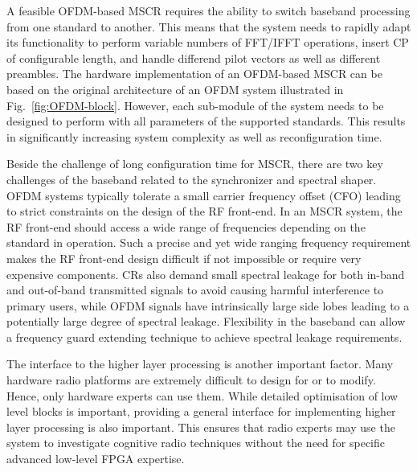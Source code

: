 A feasible OFDM-based MSCR requires the ability to switch baseband processing from one standard to another. This means that the system needs to rapidly adapt its functionality to perform variable numbers of FFT/IFFT operations, insert CP of configurable length, and handle differend pilot vectors as well as different preambles. The hardware implementation of an OFDM-based MSCR can be based on the original architecture of an OFDM system illustrated in Fig.~\ref{fig:OFDM-block}. However, each sub-module of the system needs to be designed to perform with all parameters of the supported standards. This results in significantly increasing system complexity as well as reconfiguration time.   


Beside the challenge of long configuration time for MSCR, there are two key challenges of the baseband related to the synchronizer and spectral shaper. OFDM systems typically tolerate a small carrier frequency offset (CFO) leading to strict constraints on the design of the RF front-end. In an MSCR system, the RF front-end should access a wide range of frequencies depending on the standard in operation. Such a precise and yet wide ranging frequency requirement makes the RF front-end design difficult if not impossible or require very expensive components.
CRs also demand small spectral leakage for both in-band and out-of-band transmitted signals to avoid causing harmful interference to primary users, while OFDM signals have intrinsically large side lobes leading to a potentially large degree of spectral leakage. 
Flexibility in the baseband can allow a frequency guard extending technique to achieve spectral leakage requirements.

The interface to the higher layer processing is another important factor. Many hardware radio platforms are extremely difficult to design for or to modify. Hence, only hardware experts can use them. While detailed optimisation of low level blocks is important, providing a general interface for implementing higher layer processing is also important. This ensures that radio experts may use the system to investigate cognitive radio techniques without the need for specific advanced low-level FPGA expertise.


